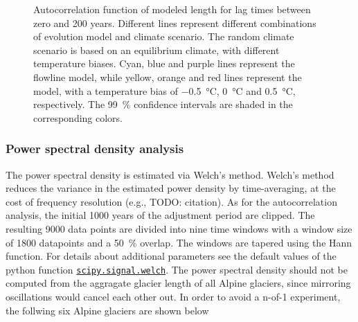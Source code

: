 \begin{figure}[htp]
\begin{subfigure}[b]{0.48\textwidth}
        \end{subfigure}

        \caption{Autocorrelation function of modeled length for lag times between zero and 200 years. Different lines represent different combinations of evolution model and climate scenario.
        The random climate scenario is based on an equilibrium climate, with different temperature biases.
        Cyan, blue and purple lines represent the flowline model, while yellow, orange and red lines represent the \vas{} model, with a temperature bias of \SI{-.5}{\celsius}, \SI{0}{\celsius} and \SI{+.5}{\celsius}, respectively.
        The \SI{99}{\percent} confidence intervals are shaded in the corresponding colors.}
        \label{fig:acf}
      \end{figure}
    

    \subsubsection{Power spectral density analysis} %
    \label{ssec:power_spectral_density_results}
      The power spectral density is estimated via Welch's method. Welch's method reduces the variance in the estimated power density by time-averaging, at the cost of frequency resolution (e.g., TODO: citation). As for the autocorrelation analysis, the initial 1000 years of the adjustment period are clipped. The resulting 9000 data points are divided into nine time windows with a window size of 1800 datapoints and a \SI{50}{\percent} overlap. The windows are tapered using the Hann function. For details about additional parameters see the default values of the python function \href{https://docs.scipy.org/doc/scipy/reference/generated/scipy.signal.welch.html}{\lstinline`scipy.signal.welch`}. The power spectral density should not be computed from the aggragate glacier length of all Alpine glaciers, since mirroring oscillations would cancel each other out. In order to avoid a n-of-1 experiment, the follwing six Alpine glaciers are shown below %

